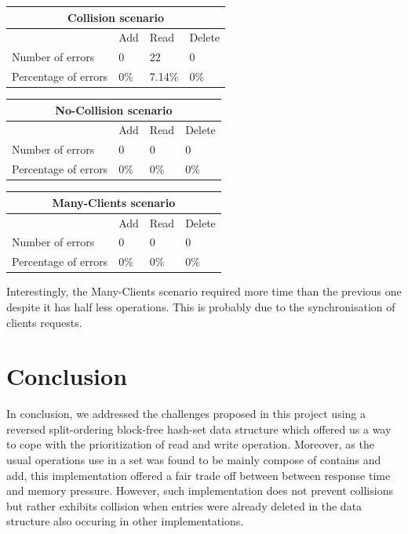 \documentclass[a4paper,11pt]{report}
\begin{document}
    \begin{centering}

        \begin{tabular}{|m{5cm}||m{3cm}|m{3cm}|m{3cm}|}\hline
            \multicolumn{4}{|c|}{Collision scenario}\\\hline\hline
           & Add & Read & Delete\\\hline
           Number of errors & 0 & 22 & 0 \\\hline
           Percentage of errors & 0\% & 7.14\% & 0\%\\\hline
        \end{tabular}

        \vspace{1cm}
        \begin{tabular}{|m{5cm}||m{3cm}|m{3cm}|m{3cm}|}\hline
            \multicolumn{4}{|c|}{No-Collision scenario}\\\hline\hline
           & Add & Read & Delete\\\hline
           Number of errors & 0 & 0 & 0 \\\hline
           Percentage of errors & 0\% & 0\% & 0\%\\\hline
        \end{tabular}

        \vspace{1cm}
        \begin{tabular}{|m{5cm}||m{3cm}|m{3cm}|m{3cm}|}\hline
            \multicolumn{4}{|c|}{Many-Clients scenario}\\\hline\hline
           & Add & Read & Delete\\\hline
           Number of errors & 0 & 0 & 0 \\\hline
           Percentage of errors & 0\% & 0\% & 0\%\\\hline
        \end{tabular}
    \end{centering}

    \vspace{1cm}
    Interestingly, the Many-Clients scenario required more time than the previous one despite it has half less operations.
    This is probably due to the synchronisation of clients requests.


    \section*{Conclusion}
    In conclusion, we addressed the challenges proposed in this project using a reversed split-ordering block-free
    hash-set data structure which offered us a way to cope with the prioritization of read and write operation.
    Moreover, as the usual operations use in a set was found to be mainly compose of contains and add, this
    implementation offered a fair trade off between between response time and memory pressure. However, such
    implementation does not prevent collisions but rather exhibits collision when entries were already deleted in the
    data structure also occuring in other implementations.
\end{document}

